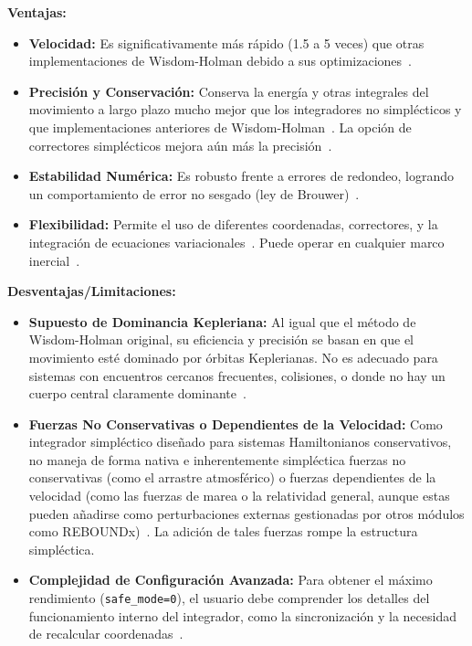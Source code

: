 \textbf{Ventajas:}
\begin{itemize}
    \item \textbf{Velocidad:} Es significativamente más rápido (1.5 a 5 veces) que otras implementaciones de Wisdom-Holman debido a sus optimizaciones~\cite{ReinTamayo2015}.
    \item \textbf{Precisión y Conservación:} Conserva la energía y otras integrales del movimiento a largo plazo mucho mejor que los integradores no simplécticos y que implementaciones anteriores de Wisdom-Holman~\cite{ReinTamayo2015, Rein2012}. La opción de correctores simplécticos mejora aún más la precisión~\cite{ReinTamayo2015}.
    \item \textbf{Estabilidad Numérica:} Es robusto frente a errores de redondeo, logrando un comportamiento de error no sesgado (ley de Brouwer)~\cite{ReinTamayo2015}.
    \item \textbf{Flexibilidad:} Permite el uso de diferentes coordenadas, correctores, y la integración de ecuaciones variacionales~\cite{ReinTamayo2015, ReboundIntegratorsDoc}. Puede operar en cualquier marco inercial~\cite{ReinTamayo2015}.
\end{itemize}

\textbf{Desventajas/Limitaciones:}
\begin{itemize}
    \item \textbf{Supuesto de Dominancia Kepleriana:} Al igual que el método de Wisdom-Holman original, su eficiencia y precisión se basan en que el movimiento esté dominado por órbitas Keplerianas. No es adecuado para sistemas con encuentros cercanos frecuentes, colisiones, o donde no hay un cuerpo central claramente dominante~\cite{Rein2012, ReboundWHFastTut}.
    \item \textbf{Fuerzas No Conservativas o Dependientes de la Velocidad:} Como integrador simpléctico diseñado para sistemas Hamiltonianos conservativos, no maneja de forma nativa e inherentemente simpléctica fuerzas no conservativas (como el arrastre atmosférico) o fuerzas dependientes de la velocidad (como las fuerzas de marea o la relatividad general, aunque estas pueden añadirse como perturbaciones externas gestionadas por otros módulos como REBOUNDx)~\cite{Hairer2006, ReboundWHFastAdvanced}. La adición de tales fuerzas rompe la estructura simpléctica.
    \item \textbf{Complejidad de Configuración Avanzada:} Para obtener el máximo rendimiento (\texttt{safe\_mode=0}), el usuario debe comprender los detalles del funcionamiento interno del integrador, como la sincronización y la necesidad de recalcular coordenadas~\cite{ReboundIntegratorsDoc, ReboundWHFastAdvanced}.
\end{itemize}

